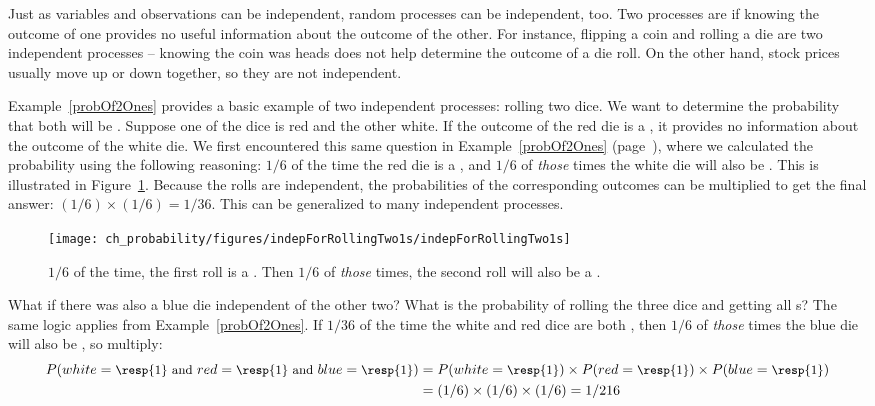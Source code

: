 Just as variables and observations can be independent, random processes can be independent, too. Two processes are  if knowing the outcome of one provides no useful information about the outcome of the other. For instance, flipping a coin and rolling a die are two independent processes -- knowing the coin was heads does not help determine the outcome of a die roll. On the other hand, stock prices usually move up or down together, so they are not independent.

Example~\ref{probOf2Ones} provides a basic example of two independent processes: rolling two dice. We want to determine the probability that both will be . Suppose one of the dice is red and the other white. If the outcome of the red die is a , it provides no information about the outcome of the white die. We first encountered this same question in Example~\ref{probOf2Ones} (page~\pageref{probOf2Ones}), where we calculated the probability using the following reasoning: $1/6$ of the time the red die is a , and $1/6$ of \emph{those} times the white die will also be . This is illustrated in Figure~\ref{indepForRollingTwo1s}. Because the rolls are independent, the probabilities of the corresponding outcomes can be multiplied to get the final answer: $(1/6)\times(1/6)=1/36$. This can be generalized to many independent processes. 

\begin{figure}[hht]
\centering
\texttt{[image: ch\_probability/figures/indepForRollingTwo1s/indepForRollingTwo1s]}
\caption{$1/6$ of the time, the first roll is a . Then $1/6$ of \emph{those} times, the second roll will also be a .}
\label{indepForRollingTwo1s}
\end{figure}

\begin{examplewrap}
\begin{nexample}{What if there was also a blue die independent of the other two? What is the probability of rolling the three dice and getting all s?}\label{threeDice}
The same logic applies from Example~\ref{probOf2Ones}. If $1/36$ of the time the white and red dice are both , then $1/6$ of \emph{those} times the blue die will also be , so multiply:
{\begin{align*}
P(white=\text{\small\resp{1} and } red=\text{\small\resp{1} and } blue=\text{\small\resp{1}})
	&= P(white=\text{\small\resp{1}})\times P(red=\text{\small\resp{1}})\times P(blue=\text{\small\resp{1}}) \\
	&= (1/6)\times (1/6)\times (1/6)
	= 1/216
\end{align*}} \vspace{-7mm}
\end{nexample}
\end{examplewrap}

